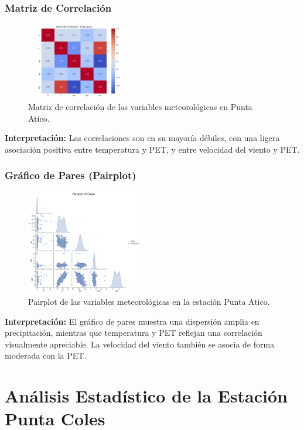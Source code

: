 \subsubsection*{Matriz de Correlación}
\begin{figure}[H]
\centering
\includegraphics[width=0.4\textwidth]{resultados/por_estacion_meteorologica/Punta_Atico/matriz_correlacion.png}
\caption{Matriz de correlación de las variables meteorológicas en Punta Atico.}
\label{fig:punta_atico_corr}
\end{figure}
\textbf{Interpretación:} Las correlaciones son en su mayoría débiles, con una ligera asociación positiva entre temperatura y PET, y entre velocidad del viento y PET.

\subsubsection*{Gráfico de Pares (Pairplot)}
\begin{figure}[H]
\centering
\includegraphics[width=0.45\textwidth]{resultados/por_estacion_meteorologica/Punta_Atico/pairplot.png}
\caption{Pairplot de las variables meteorológicas en la estación Punta Atico.}
\label{fig:punta_atico_pairplot}
\end{figure}
\textbf{Interpretación:} El gráfico de pares muestra una dispersión amplia en precipitación, mientras que temperatura y PET reflejan una correlación visualmente apreciable. La velocidad del viento también se asocia de forma moderada con la PET.




\section{Análisis Estadístico de la Estación Punta Coles}

